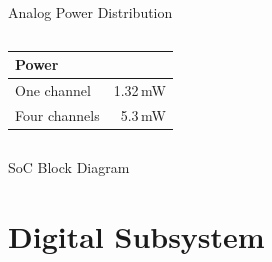 \documentclass[10pt, aspectratio=169]{beamer}
\begin{document}
\begin{frame}{Analog Power Distribution}
\begin{columns}[T]
\vspace{0.3cm}
\resizebox{\linewidth}{!}{}
\vspace{0.5cm}
{\footnotesize
\begin{tabular}{@{}lr@{}}
\toprule
Power & \\
\midrule
One channel   & 1.32\,mW \\
Four channels & 5.3\,mW \\
\bottomrule
\end{tabular}}
\end{columns}
\end{frame}

\begin{frame}{SoC Block Diagram}
\end{frame}

\section{Digital Subsystem}
\end{document}

